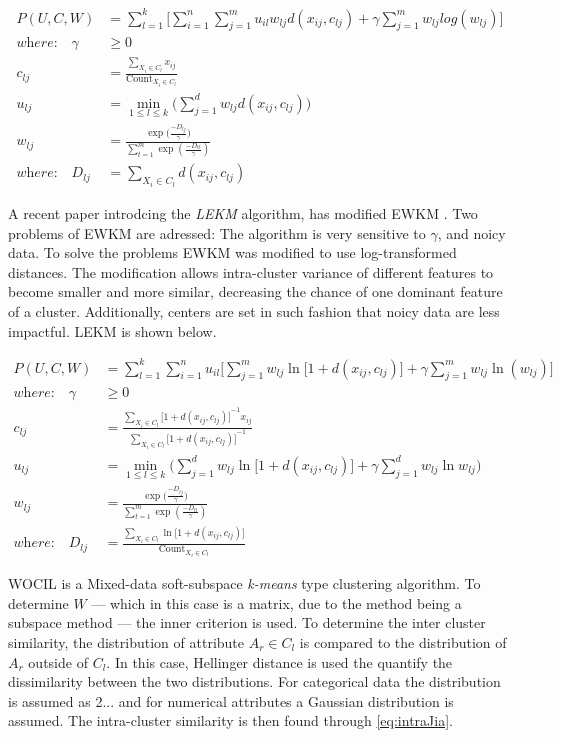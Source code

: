 \documentclass[../report.tex]{subfiles}
\begin{document}
\begin{align}
  P(U,C,W) &= \sum^k_{l=1} \Bigg[ \sum^n_{i=1} \sum^m_{j=1} u_{il} w_{ lj } d(x_{ij},c_{lj}) + \gamma \sum_{j=1}^{m}{ w_{lj} log (w_{lj}) } \Bigg] \\
\textit{where:}\quad\gamma&\geq 0 \\
\label{eq:ewkm}
c_{lj} &= \frac{\sum_{X_i \in C_l}{ x_{ij} }}{\text{Count}_{X_i \in C_l}} \\
u_{lj} &= \min_{1 \leq l \leq k}\Big( \sum_{j=1}^{d} w_{lj} d(x_{ij},c_{ lj })\Big) \\
	w_{lj} &= \frac{\exp({\frac{-D_{lj}}{\gamma})}}{\sum_{t=1}^{m}{\exp{(\frac{-D_{lt}}{\gamma})}}} \\
\textit{where:}\quad D_{ lj } &= \sum_{X_i \in C_l}{d(x_{ij},c_{ lj })}
\end{align}

A recent paper introdcing the \textit{LEKM} algorithm, has modified EWKM \cite{Gan2016}. Two problems of EWKM are adressed: The algorithm is very sensitive to $\gamma$, and noicy data. To solve the problems EWKM was modified to use log-transformed distances. The modification allows intra-cluster variance of different features to become smaller and more similar, decreasing the chance of one dominant feature of a cluster. Additionally, centers are set in such fashion that noicy data are less impactful. LEKM is shown below.

\begin{align}
  P(U,C,W) &= \sum^k_{l=1} \sum^n_{i=1} u_{il} \Bigg[ \sum^m_{j=1} w_{ lj } \ln\big[1 + d(x_{ij},c_{lj})\big] + \gamma \sum_{j=1}^{m}{ w_{lj} \ln (w_{lj}) } \Bigg] \\
\textit{where:}\quad\gamma&\geq 0 \\
\label{eq:lekm}
        c_{lj} &= \frac{\sum_{X_i \in C_l}{ {\big[1 + d(x_{ij},c_{ lj })\big]}^{-1} x_{ij} }}{\sum_{X_i \in C_l}{\big[1 + d(x_{ij},c_{ lj })\big]}^{-1}} \\
        u_{lj} &= \min_{1 \leq l \leq k}\Bigg(\sum_{j=1}^{d} w_{lj} \ln\big[1 + d(x_{ij},c_{ lj })\big] + \gamma \sum_{j=1}^{d} w_{lj} \ln w_{lj}\Bigg) \\
	w_{lj} &= \frac{\exp({\frac{-D_{lj}}{\gamma})}}{\sum_{t=1}^{m}{\exp{(\frac{-D_{lt}}{\gamma})}}} \\
        \textit{where:}\quad D_{ lj } &= \frac{\sum_{X_i \in C_l}{\ln\big[1 + d(x_{ij},c_{ lj })\big]}}{\text{Count}_{X_i \in C_l}}
\end{align}

WOCIL \cite{Jia2018} is a Mixed-data soft-subspace \textit{k-means} type clustering algorithm.
To determine $W$ --- which in this case is a matrix, due to the method being a subspace method --- the inner criterion is used. To determine the inter cluster similarity, the distribution of attribute $A_r \in C_l$ is compared to the distribution of $A_r$ outside of $C_l$. In this case, Hellinger distance is used the quantify the dissimilarity between the two distributions. For categorical data the distribution is assumed as 2... and for numerical attributes a Gaussian distribution is assumed. The intra-cluster similarity is then found through \ref{eq:intraJia}.
\end{document}
